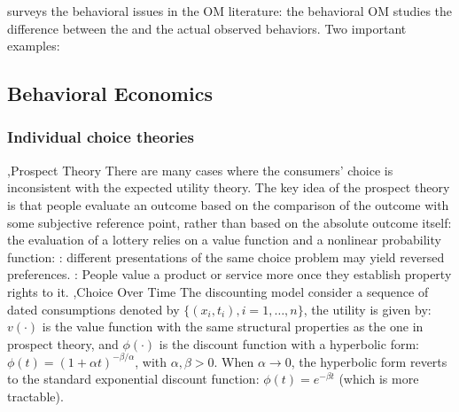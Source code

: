 \documentclass[10pt]{report}
\begin{document}
\cite{Donohue2020} surveys the behavioral issues in the OM literature: the behavioral OM studies the difference between the  and the actual observed behaviors. 
Two important examples: 

\subsection{Behavioral Economics}

\subsubsection{Individual choice theories}
\sep{Prospect Theory} 
There are many cases where the consumers' choice is inconsistent with the expected utility theory. The key idea of the prospect 
theory is that people evaluate an outcome based on the comparison of the outcome with some subjective reference point, rather than based on the absolute outcome itself: 
the evaluation of a lottery relies on a value function and a nonlinear probability function:
: different presentations of the same choice problem may yield reversed preferences. : 
People value a product or service more once they establish property rights to it. 
\sep{Choice Over Time}
The  discounting model consider a sequence of dated consumptions denoted by $\{(x_i,t_i),i=1,\ldots,n\}$, the utility is given by:
$v(\cdot)$ is the value function with the same structural properties as the one in prospect theory, and $\phi(\cdot)$ is the discount function with a hyperbolic form: 
$\phi(t)=(1+\alpha t)^{-\beta/\alpha}$, with $\alpha,\beta>0$. When $\alpha\to 0$, the hyperbolic form reverts to the standard exponential discount function: 
$\phi(t)=e^{-\beta t}$ (which is more tractable).
\end{document}
